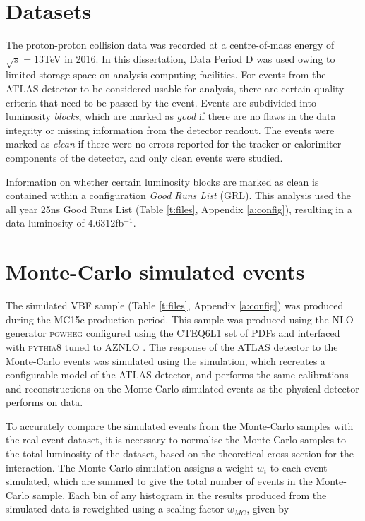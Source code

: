 	\section{Datasets}

	The proton-proton collision data was recorded at a centre-of-mass energy of $\sqrt{s}=13$TeV in 2016. In this dissertation, Data Period D was used owing to limited storage space on analysis computing facilities. For events from the ATLAS detector to be considered usable for analysis, there are certain quality criteria that need to be passed by the event. Events are subdivided into luminosity \textit{blocks}, which are marked as \textit{good} if there are no flaws in the data integrity or missing information from the detector readout. The events were marked as \textit{clean} if there were no errors reported for the tracker or calorimiter components of the detector, and only clean events were studied.

	Information on whether certain luminosity blocks are marked as clean is contained within a configuration \textit{Good Runs List} (GRL). This analysis used the all year 25ns Good Runs List (Table \ref{t:files}, Appendix \ref{a:config}), resulting in a data luminosity of $4.6312$fb$^{-1}$.

	\section{Monte-Carlo simulated events}

		 The simulated VBF sample (Table \ref{t:files}, Appendix \ref{a:config}) was produced during the MC15c production period. This sample was produced using the NLO generator \textsc{powheg} configured using the CTEQ6L1 \cite{CTEQ} set of PDFs and interfaced with \textsc{pythia8} tuned to AZNLO \cite{AZNLO}. The response of the ATLAS detector to the Monte-Carlo events was simulated using the  \cite{geant4, geant4atlas} simulation, which recreates a configurable model of the ATLAS detector, and performs the same calibrations and reconstructions on the Monte-Carlo simulated events as the physical detector performs on data.

		 To accurately compare the simulated events from the Monte-Carlo samples with the real event dataset, it is necessary to normalise the Monte-Carlo samples to the total luminosity of the dataset, based on the theoretical cross-section for the interaction. The Monte-Carlo simulation assigns a weight $w_i$ to each event simulated, which are summed to give the total number of events in the Monte-Carlo sample. Each bin of any histogram in the results produced from the simulated data is reweighted using a scaling factor $w_{MC}$, given by

